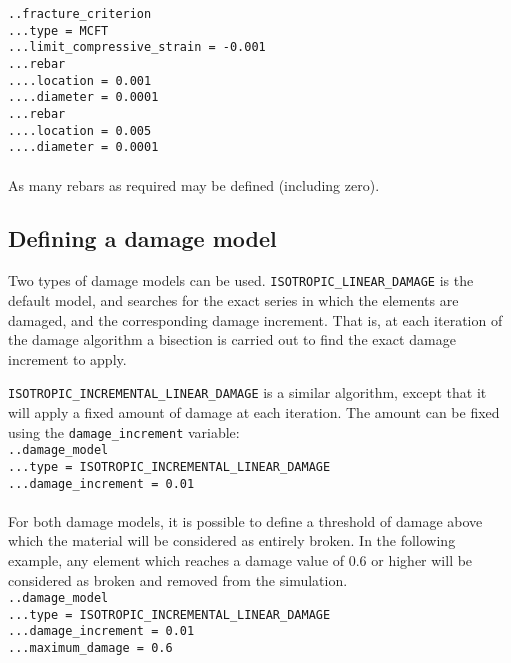\documentclass[10pt]{article}
\begin{document}
\noindent \verb+..fracture_criterion+\\
\verb+...type = MCFT+\\
\verb+...limit_compressive_strain = -0.001+\\
\verb+...rebar+\\
\verb+....location = 0.001+\\
\verb+....diameter = 0.0001+\\
\verb+...rebar+\\
\verb+....location = 0.005+\\
\verb+....diameter = 0.0001+

\paragraph{} As many rebars as required may be defined (including zero).

\subsection{Defining a damage model}

Two types of damage models can be used. \verb+ISOTROPIC_LINEAR_DAMAGE+ is the default model, and searches for the exact series in which the elements are damaged, and the corresponding damage increment. That is, at each iteration of the damage algorithm a bisection is carried out to find the exact damage increment to apply.

\verb+ISOTROPIC_INCREMENTAL_LINEAR_DAMAGE+ is a similar algorithm, except that it will apply a fixed amount of damage at each iteration. The amount can be fixed using the \verb+damage_increment+ variable:\\

\noindent \verb+..damage_model+\\
\verb+...type = ISOTROPIC_INCREMENTAL_LINEAR_DAMAGE+\\
\verb+...damage_increment = 0.01+

\paragraph{} For both damage models, it is possible to define a threshold of damage above which the material will be considered as entirely broken. In the following example, any element which reaches a damage value of 0.6 or higher will be considered as broken and removed from the simulation.\\

\noindent \verb+..damage_model+\\
\verb+...type = ISOTROPIC_INCREMENTAL_LINEAR_DAMAGE+\\
\verb+...damage_increment = 0.01+\\
\verb+...maximum_damage = 0.6+
\end{document}
